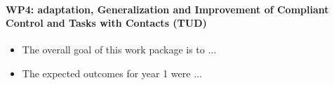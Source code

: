 \paragraph{WP4: adaptation, Generalization and Improvement of Compliant Control and Tasks with Contacts (TUD)}

\begin{itemize}
\item The overall goal of this work package is to $\dots$

\item The expected outcomes for year 1 were $\dots$  
\end{itemize}

